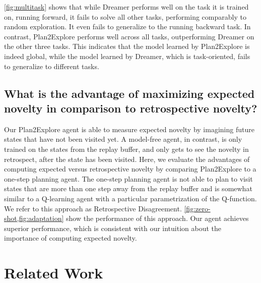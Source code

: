 \documentclass{article}
\begin{document}
\cref{fig:multitask} shows that while Dreamer performs well on the task it is trained on, running forward, it fails to solve all other tasks, performing comparably to random exploration. It even fails to generalize to the running backward task. In contrast, Plan2Explore performs well across all tasks, outperforming Dreamer on the other three tasks. This indicates that the model learned by Plan2Explore is indeed global, while the model learned by Dreamer, which is task-oriented, fails to generalize to different tasks.

%
%
%
%
%
%
%
%
%
%

%

%


%




%

%
%
%
%

%
%

%

%
\subsection{What is the advantage of maximizing expected novelty in comparison to retrospective novelty?}

\label{sec:retrospective}

Our Plan2Explore agent is able to measure expected novelty by imagining future states that have not been visited yet. A model-free agent, in contrast, is only trained on the states from the replay buffer, and only gets to see the novelty in retrospect, after the state has been visited. Here, we evaluate the advantages of computing expected versus retrospective novelty by comparing Plan2Explore to a one-step planning agent. The one-step planning agent is not able to plan to visit states that are more than one step away from the replay buffer and is somewhat similar to a Q-learning agent with a particular parametrization of the Q-function. We refer to this approach as Retrospective Disagreement. \cref{fig:zero-shot,fig:adaptation} show the performance of this approach. Our agent achieves superior performance, which is consistent with our intuition about the importance of computing expected novelty.

%
%
%

%
%


\section{Related Work}
%
%
%
%
%
%
%
\end{document}
